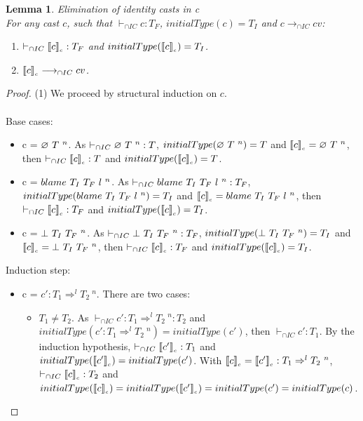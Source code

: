 \documentclass[a4paper]{article}
\newtheorem{lemma}{Lemma}
\begin{document}
\begin{lemma}
\label{eliminationidentitycastsc}
Elimination of identity casts in c\\
For any cast $c$, such that $\vdash_{\cap IC} c : T_F$, $initialType(c) = T_I$ and $c \longrightarrow_{\cap IC} cv$:
\begin{enumerate}
    \item $\vdash_{\cap IC} \llbracket c \rrbracket_{_c} : T_F$ and $initialType(\llbracket c \rrbracket_{_c}) = T_I$.
    \item $\llbracket c \rrbracket_{_c} \longrightarrow_{\cap IC} cv$.
\end{enumerate}
\end{lemma}
\begin{proof}
(1) We proceed by structural induction on $c$.\\\\
Base cases:
\begin{itemize}
    \item c = $\varnothing\ T\ ^{n}$.
    As $\vdash_{\cap IC} \varnothing\ T\ ^{n} : T$, $initialType(\varnothing\ T\ ^{n}) = T$ and $\llbracket c \rrbracket_{_c} = \varnothing\ T\ ^{n}$, then $\vdash_{\cap IC} \llbracket c \rrbracket_{_c} : T$ and $initialType(\llbracket c \rrbracket_{_c}) = T$.
    \item c = $blame\ T_I\ T_F\ l\ ^{n}$.
    As $\vdash_{\cap IC} blame\ T_I\ T_F\ l\ ^{n} : T_F$, $initialType(blame\ T_I\ T_F\ l\ ^{n}) = T_I$ and $\llbracket c \rrbracket_{_c} = blame\ T_I\ T_F\ l\ ^{n}$, then $\vdash_{\cap IC} \llbracket c \rrbracket_{_c} : T_F$ and $initialType(\llbracket c \rrbracket_{_c}) = T_I$.
    \item c = $\bot\ T_I\ T_F\ ^{n}$.
    As $\vdash_{\cap IC} \bot\ T_I\ T_F\ ^{n} : T_F$, $initialType(\bot\ T_I\ T_F\ ^{n}) = T_I$ and $\llbracket c \rrbracket_{_c} = \bot\ T_I\ T_F\ ^{n}$, then $\vdash_{\cap IC} \llbracket c \rrbracket_{_c} : T_F$ and $initialType(\llbracket c \rrbracket_{_c}) = T_I$.
\end{itemize}
Induction step:
\begin{itemize}
    \item c = $c' : T_1 \Rightarrow^l T_2\ ^n$.
    There are two cases:
    \begin{itemize}
        \item $T_1 \neq T_2$.
        As $\vdash_{\cap IC} c' : T_1 \Rightarrow^l T_2\ ^n : T_2$ and $initialType(c' : T_1 \Rightarrow^l T_2\ ^n) = initialType(c')$, then $\vdash_{\cap IC} c' : T_1$.
        By the induction hypothesis, $\vdash_{\cap IC} \llbracket c' \rrbracket_{_c} : T_1$ and $initialType(\llbracket c' \rrbracket_{_c}) = initialType(c')$.
        With $\llbracket c \rrbracket_{_c} = \llbracket c' \rrbracket_{_c} : T_1 \Rightarrow^l T_2\ ^n$, $\vdash_{\cap IC} \llbracket c \rrbracket_{_c} : T_2$ and $initialType(\llbracket c \rrbracket_{_c}) = initialType(\llbracket c' \rrbracket_{_c}) = initialType(c') = initialType(c)$.

\end{itemize}
\end{itemize}
\end{proof}
\end{document}
